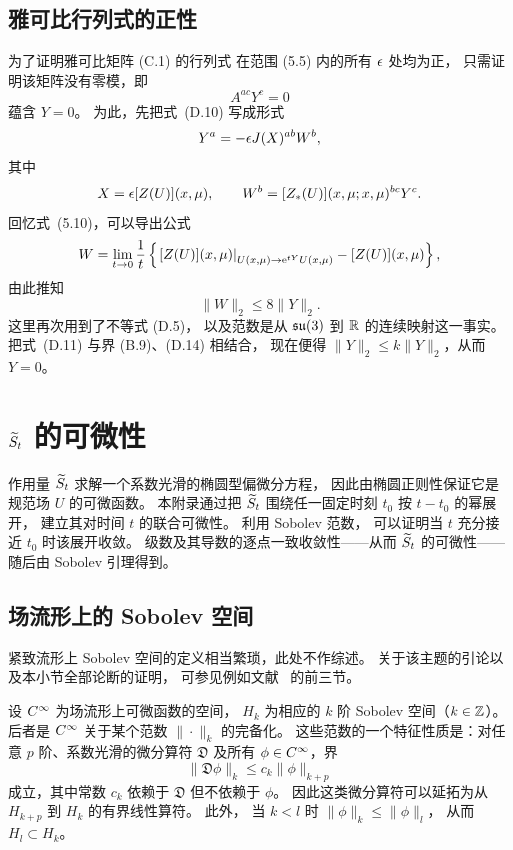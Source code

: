 \subsection{雅可比行列式的正性}

为了证明雅可比矩阵 (C.1) 的行列式
在范围 (5.5) 内的所有 $\epsilon$ 处均为正，
只需证明该矩阵没有零模，即
\begin{equation}
  A^{ac}Y^c=0
\end{equation}
蕴含 $Y=0$。
为此，先把式~(D.10) 写成形式
\begin{equation}
  Y^a=-\epsilon J(X)^{ab}W^b,
\end{equation}
其中
\begin{equation}
  X=\epsilon[Z(U)](x,\mu),\qquad
  W^b=[Z_{*}(U)](x,\mu;x,\mu)^{bc}Y^c.
\end{equation}
回忆式~(5.10)，可以导出公式
\begin{equation}
  W=\lim_{t\to0}{1\over t}\left\{
  \left.[Z(U)](x,\mu)\right|_{U(x,\mu)\to\mathrm{e}^{tY}U(x,\mu)}-[Z(U)](x,\mu)
  \right\},
\end{equation}
由此推知
\begin{equation}
  \|W\|_2\leq 8\|Y\|_2.
\end{equation}
这里再次用到了不等式 (D.5)，
以及范数是从 $\mathfrak{su}(3)$ 到 $\mathbb{R}$ 的连续映射这一事实。
把式~(D.11) 与界 (B.9)、(D.14) 相结合，
现在便得 $\|Y\|_2\leq k\|Y\|_2$，从而 $Y=0$。

\section{$\widetilde{S}_t$ 的可微性}

作用量 $\widetilde{S}_t$ 求解一个系数光滑的椭圆型偏微分方程，
因此由椭圆正则性保证它是规范场 $U$ 的可微函数。
本附录通过把 $\widetilde{S}_t$
围绕任一固定时刻 $t_0$ 按 $t-t_0$ 的幂展开，
建立其对时间 $t$ 的联合可微性。
利用 Sobolev 范数，
可以证明当 $t$ 充分接近 $t_0$ 时该展开收敛。
级数及其导数的逐点一致收敛性——从而 $\widetilde{S}_t$ 的可微性——
随后由 Sobolev 引理得到。


\subsection{场流形上的 Sobolev 空间}

紧致流形上 Sobolev 空间的定义相当繁琐，此处不作综述。
关于该主题的引论以及本小节全部论断的证明，
可参见例如文献~\cite{Gilkey} 的前三节。

设 $C^{\infty}$ 为场流形上可微函数的空间，
$H_k$ 为相应的 $k$ 阶 Sobolev 空间（$k\in\mathbb{Z}$）。
后者是 $C^{\infty}$ 关于某个范数 $\|\cdot\|_k$ 的完备化。
这些范数的一个特征性质是：对任意 $p$ 阶、系数光滑的微分算符 $\mathfrak{D}$
及所有 $\phi\in C^{\infty}$，界
\begin{equation}
  \|\mathfrak{D}\phi\|_k\leq c_k\|\phi\|_{k+p}
\end{equation}
成立，其中常数 $c_k$ 依赖于 $\mathfrak{D}$ 但不依赖于 $\phi$。
因此这类微分算符可以延拓为从 $H_{k+p}$ 到 $H_k$ 的有界线性算符。
此外，
当 $k<l$ 时 $\|\phi\|_k\leq\|\phi\|_l$，
从而 $H_l\subset H_k$。

